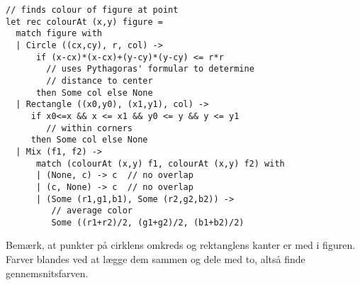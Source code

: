 \documentclass[a4paper,12pt]{article}
\begin{document}
\begin{lstlisting}[numbers=none,frame=none,mathescape]
// finds colour of figure at point
let rec colourAt (x,y) figure =
  match figure with
  | Circle ((cx,cy), r, col) ->
      if (x-cx)*(x-cx)+(y-cy)*(y-cy) <= r*r
        // uses Pythagoras' formular to determine
        // distance to center
      then Some col else None
  | Rectangle ((x0,y0), (x1,y1), col) ->
     if x0<=x && x <= x1 && y0 <= y && y <= y1
        // within corners
     then Some col else None
  | Mix (f1, f2) ->
      match (colourAt (x,y) f1, colourAt (x,y) f2) with
      | (None, c) -> c  // no overlap
      | (c, None) -> c  // no overlap
      | (Some (r1,g1,b1), Some (r2,g2,b2)) ->
         // average color
         Some ((r1+r2)/2, (g1+g2)/2, (b1+b2)/2)
\end{lstlisting}

\noindent
Bemærk, at punkter på cirklens omkreds og rektanglens kanter er med i
figuren.  Farver blandes ved at lægge dem sammen og dele med to, altså
finde gennemsnitsfarven.
\end{document}
